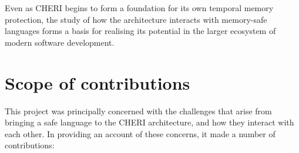 \documentclass[dissertation.tex]{subfiles}
\begin{document}
Even as CHERI begins to form a foundation for its own temporal memory
protection, the study of how the architecture interacts with memory-safe
languages forms a basis for realising its potential in the larger
ecosystem of modern software development.


\section{Scope of contributions}

This project was principally concerned with the challenges that arise
from bringing a safe language to the CHERI architecture, and how they
interact with each other.
In providing an account of these concerns, it made a number of
contributions:

\end{document}
